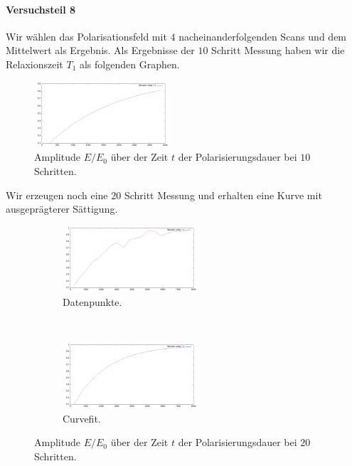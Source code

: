 \documentclass{subfiles}
\begin{document}
        \paragraph*{Versuchsteil 8}
            Wir wählen das Polarisationsfeld mit $4$ nacheinanderfolgenden Scans und dem Mittelwert als Ergebnis. 
            Als Ergebnisse der $10$ Schritt Messung haben wir die Relaxionszeit $T_1$ als folgenden Graphen.
            \begin{figure}[H]
                \centering
                \includegraphics[width=5cm]{Live-Dokumente/Bilder/B1-10steps/T1.png}
                \caption{Amplitude $E/E_0$ über der Zeit $t$ der Polarisierungsdauer bei $10$ Schritten.}
                \label{fig:T1}
            \end{figure}
            Wir erzeugen noch eine $20$ Schritt Messung und erhalten eine Kurve mit ausgeprägterer Sättigung.
            \begin{figure}
                \centering
                \begin{subfigure}[b]{0.4\textwidth}
                    \centering
                    \includegraphics[width=5cm]{Live-Dokumente/Bilder/T1-20steps/T1.png}
                    \caption{Datenpunkte.}
                \end{subfigure}
                \
                \begin{subfigure}[b]{0.4\textwidth}
                    \centering
                    \includegraphics[width=5cm]{Live-Dokumente/Bilder/T1-20steps/T1_fit.png}
                    \caption{Curvefit.}
                \end{subfigure}
                \caption{Amplitude $E/E_0$ über der Zeit $t$ der Polarisierungsdauer bei $20$ Schritten.}
                \label{fig:T1-20steps}
            \end{figure}
\end{document}
